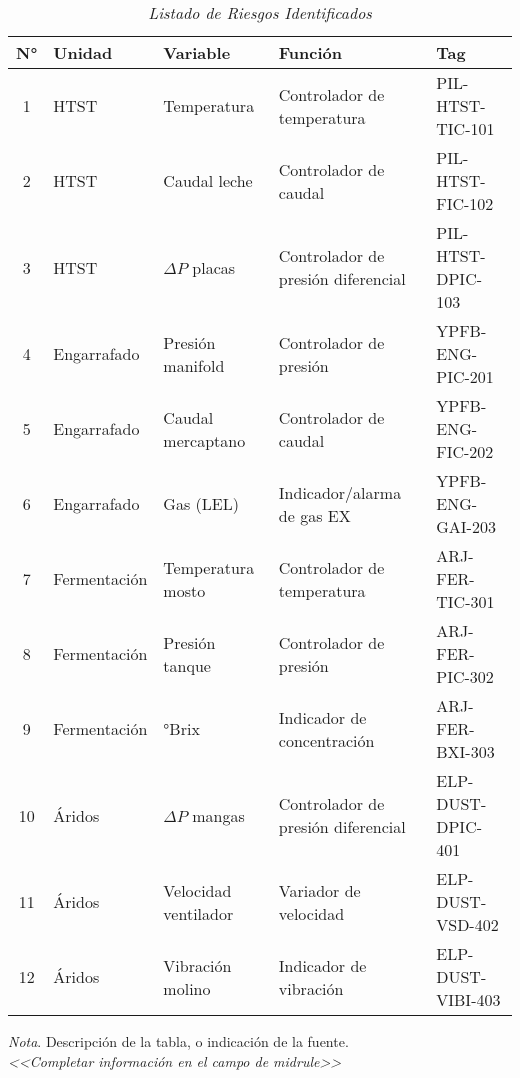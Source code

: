 \documentclass[12pt,letterpaper]{report}
\begin{document}
	\begin{table}[ht]
		\captionsetup{justification=raggedright,singlelinecheck=false}
		\caption{\textit{Listado de Riesgos Identificados}}
		\label{tab:tag_ISA} %
		\centering
		\begin{tabular}{cllll}
			\toprule
			\textbf{N°} & \textbf{Unidad} & \textbf{Variable} & \textbf{Función} & \textbf{Tag} \\
			\midrule
			1 & HTST & Temperatura & Controlador de temperatura & PIL-HTST-TIC-101 \\
			2 & HTST & Caudal leche & Controlador de caudal & PIL-HTST-FIC-102 \\
			3 & HTST & $\Delta P$ placas & Controlador de presión diferencial & PIL-HTST-DPIC-103 \\
			4 & Engarrafado & Presión manifold & Controlador de presión & YPFB-ENG-PIC-201 \\
			5 & Engarrafado & Caudal mercaptano & Controlador de caudal & YPFB-ENG-FIC-202 \\
			6 & Engarrafado & Gas (LEL) & Indicador/alarma de gas EX & YPFB-ENG-GAI-203 \\
			7 & Fermentación & Temperatura mosto & Controlador de temperatura & ARJ-FER-TIC-301 \\
			8 & Fermentación & Presión tanque & Controlador de presión & ARJ-FER-PIC-302 \\
			9 & Fermentación & °Brix & Indicador de concentración & ARJ-FER-BXI-303 \\
			10 & Áridos & $\Delta P$ mangas & Controlador de presión diferencial & ELP-DUST-DPIC-401 \\
			11 & Áridos & Velocidad ventilador & Variador de velocidad & ELP-DUST-VSD-402 \\
			12 & Áridos & Vibración molino & Indicador de vibración & ELP-DUST-VIBI-403 \\
			\bottomrule
		\end{tabular}
		
		\begin{flushleft}
			\textit{Nota}. Descripción de la tabla, o indicación de la fuente. \\
			\textit{<<Completar información en el campo de midrule>>}
		\end{flushleft}
	\end{table}
	
\end{document}
